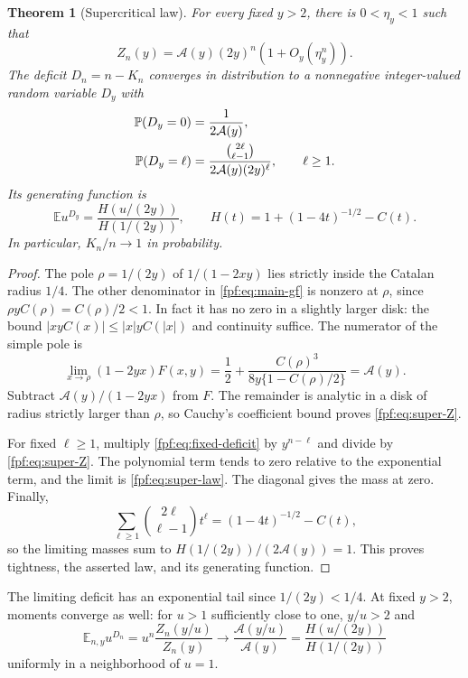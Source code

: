 \documentclass[11pt]{article}
\numberwithin{equation}{section}
\newtheorem{theorem}{Theorem}[section]
\theoremstyle{definition}
\newcommand{\E}{\mathbb E}
\newcommand{\Prob}{\mathbb P}
\begin{document}
\begin{theorem}[Supercritical law]\label{fpf:thm:supercritical}
For every fixed $y>2$, there is $0<\eta_y<1$ such that
\begin{equation}\label{fpf:eq:super-Z}
 Z_n(y)=\mathcal A(y)(2y)^n(1+O_y(\eta_y^n)).
\end{equation}
The deficit $D_n=n-K_n$ converges in distribution to a nonnegative
integer-valued random variable $D_y$ with
\begin{align}\label{fpf:eq:super-law}
 \Prob(D_y=0)&=\frac1{2\mathcal A(y)},\notag\\
 \Prob(D_y=\ell)&=\frac{\binom{2\ell}{\ell-1}}
                         {2\mathcal A(y)(2y)^\ell},\qquad \ell\ge1.
\end{align}
Its generating function is
\begin{equation}\label{fpf:eq:super-pgf}
 \E u^{D_y}=\frac{H(u/(2y))}{H(1/(2y))},\qquad
 H(t)=1+(1-4t)^{-1/2}-C(t).
\end{equation}
In particular, $K_n/n\to1$ in probability.
\end{theorem}
\begin{proof}
The pole $\rho=1/(2y)$ of $1/(1-2xy)$ lies strictly inside the Catalan
radius $1/4$. The other denominator in \eqref{fpf:eq:main-gf} is nonzero at
$\rho$, since $\rho yC(\rho)=C(\rho)/2<1$. In fact it has no zero in a
slightly larger disk: the bound
$|xyC(x)|\le |x|yC(|x|)$ and continuity suffice.
The numerator of the simple pole is
\[
 \lim_{x\to\rho}(1-2yx)F(x,y)
 =\frac12+\frac{C(\rho)^3}{8y\{1-C(\rho)/2\}}
 =\mathcal A(y).
\]
Subtract $\mathcal A(y)/(1-2yx)$ from $F$. The remainder is analytic in a
disk of radius strictly larger than $\rho$, so Cauchy's coefficient bound
proves \eqref{fpf:eq:super-Z}.

For fixed $\ell\ge1$, multiply \eqref{fpf:eq:fixed-deficit} by $y^{n-\ell}$
and divide by \eqref{fpf:eq:super-Z}. The polynomial term tends to zero
relative to the exponential term, and the limit is
\eqref{fpf:eq:super-law}. The diagonal gives the mass at zero. Finally,
\[
 \sum_{\ell\ge1}\binom{2\ell}{\ell-1}t^\ell
 =(1-4t)^{-1/2}-C(t),
\]
so the limiting masses sum to
$H(1/(2y))/(2\mathcal A(y))=1$.
This proves tightness, the asserted law, and its generating function.
\end{proof}
The limiting deficit has an exponential tail since $1/(2y)<1/4$.
At fixed $y>2$, moments converge as well: for $u>1$ sufficiently close to
one, $y/u>2$ and
\[
 \E_{n,y}u^{D_n}=u^n\frac{Z_n(y/u)}{Z_n(y)}
 \longrightarrow\frac{\mathcal A(y/u)}{\mathcal A(y)}
 =\frac{H(u/(2y))}{H(1/(2y))}
\]
uniformly in a neighborhood of $u=1$.
\end{document}
